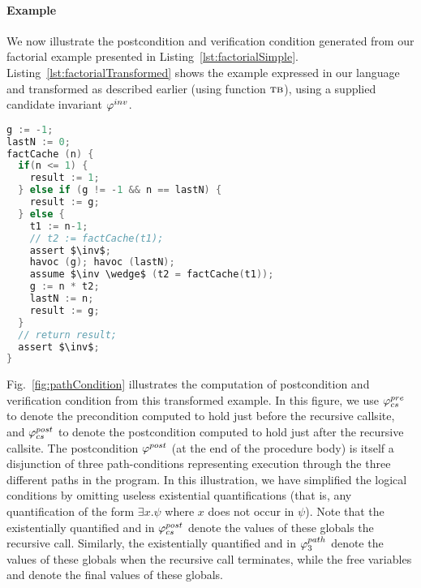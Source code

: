 \paragraph{Example}
We now illustrate the postcondition and verification condition generated from our factorial example
presented in Listing~\ref{lst:factorialSimple}. Listing~\ref{lst:factorialTransformed} shows the example
expressed in our language and transformed as described earlier (using function $\textsc{tb}$), using a
supplied candidate invariant $\varphi^{inv}$.

\begin{lstlisting}[float,language=c,mathescape=true,basicstyle=\scriptsize,caption= {Procedure factCache from
      Listing~\ref{lst:factorialSimple} transformed to incorporate a supplied candidate
      invariant $\inv$.}, label=lst:factorialTransformed]
g := -1;
lastN := 0;
factCache (n) {
  if(n <= 1) {
    result := 1;
  } else if (g != -1 && n == lastN) {
    result := g;
  } else {
    t1 := n-1;
    // t2 := factCache(t1);
    assert $\inv$;
    havoc (g); havoc (lastN);
    assume $\inv \wedge$ (t2 = factCache(t1));
    g := n * t2;
    lastN := n;
    result := g;
  }
  // return result;
  assert $\inv$;
}
\end{lstlisting}

Fig.~\ref{fig:pathCondition} illustrates the computation of postcondition and verification condition from
this transformed example. In this figure, we use $\varphi^{pre}_{cs}$ to denote the precondition computed to hold
just before the recursive callsite, and $\varphi^{post}_{cs}$ to denote the postcondition computed to hold just
after the recursive callsite. The postcondition $\varphi^{post}$ (at the end of the procedure body) is itself
a disjunction of three path-conditions representing execution through the three different paths in
the program. In this illustration, we have simplified the logical conditions by omitting useless existential
quantifications (that is, any quantification of the form $\exists x. \psi$ where $x$ does not occur in $\psi$).
Note that the existentially quantified  and  in $\varphi^{post}_{cs}$ denote the values of these
globals  the recursive call. Similarly, the existentially quantified  and  in
$\varphi^{path}_3$ denote the values of these globals when the recursive call terminates, while the free variables
 and  denote the final values of these globals.

